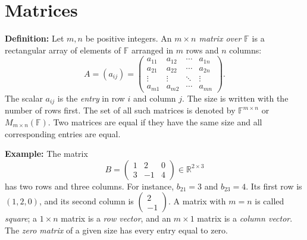 \documentclass[a4paper,11pt,abstract=true]{scrartcl}
\theoremstyle{dotlessP}
\theoremstyle{dotlessS}
\theoremstyle{remark}
\theoremstyle{definition}
\begin{document}
\section{Matrices}

\begin{definition_box}
\textbf{Definition:} Let $m,n$ be positive integers. An
\emph{$m\times n$ matrix over $\mathbb{F}$} is a rectangular array of
elements of $\mathbb{F}$ arranged in $m$ rows and $n$ columns:
\[
A=(a_{ij})=
\begin{pmatrix}
a_{11}&a_{12}&\cdots&a_{1n}\\
a_{21}&a_{22}&\cdots&a_{2n}\\
\vdots&\vdots&\ddots&\vdots\\
a_{m1}&a_{m2}&\cdots&a_{mn}
\end{pmatrix}.
\]
The scalar $a_{ij}$ is the \emph{entry} in row $i$ and column $j$.
The size is written with the number of rows first. The set of all such
matrices is denoted by $\mathbb{F}^{m\times n}$ or
$M_{m\times n}(\mathbb{F})$. Two matrices are equal if they have the
same size and all corresponding entries are equal.
\end{definition_box}

\begin{example_box}
\textbf{Example:} The matrix
\[
B=\begin{pmatrix}1&2&0\\3&-1&4\end{pmatrix}
\in\mathbb{R}^{2\times3}
\]
has two rows and three columns. For instance, $b_{21}=3$ and $b_{23}=4$.
Its first row is $(1,2,0)$, and its second column is
$\begin{pmatrix}2\\-1\end{pmatrix}$.
A matrix with $m=n$ is called \emph{square}; a $1\times n$ matrix is a
\emph{row vector}, and an $m\times1$ matrix is a \emph{column vector}.
The \emph{zero matrix} of a given size has every entry equal to zero.
\end{example_box}
\end{document}
